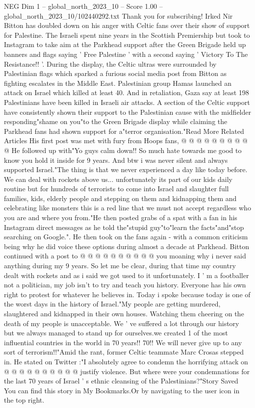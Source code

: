 \begin{textsample}{NEG Dim 1 – global\_north\_2023\_10 – Score 1.00 – global\_north\_2023\_10/102440292.txt}  \label{ex:f1_neg_131}
Thank you for subscribing!
Irked Nir Bitton has doubled down on his anger with Celtic fans over their show of support for Palestine.
The Israeli spent nine years in the Scottish Premiership but took to Instagram to take aim at the Parkhead support after the Green Brigade held up banners and flags saying ' Free Palestine ' with a second saying ' Victory To The Resistance!! '.
During the display, the Celtic ultras were surrounded by Palestinian flags which sparked a furious social media post from Bitton as fighting escalates in the Middle East.
Palestinian group Hamas launched an attack on Israel which killed at least 40.
And in retaliation, Gaza say at least 198 Palestinians have been killed in Israeli air attacks.
A section of the Celtic support have consistently shown their support to the Palestinian cause with the midfielder responding"shame on you"to the Green Brigade display while claiming the Parkhead fans had shown support for a"terror organisation."Read More Related Articles His first post was met with fury from Hoops fans, @ @ @ @ @ @ @ @ @ @ He followed up with"Yo guys calm down!!
So much hate towards me good to know you hold it inside for 9 years.
And btw i was never silent and always supported Israel."The thing is that we never experienced a day like today before.
We can deal with rockets above us... unfortunately its part of our kids daily routine but for hundreds of terrorists to come into Israel and slaughter full families, kids, elderly people and stepping on them and kidnapping them and celebrating like monsters this is a red line that we must not accept regardless who you are and where you from."He then posted grabs of a spat with a fan in his Instagram direct messages as he told the"stupid guy"to"learn the facts"and"stop searching on Google.".
He then took on the fans again - with a common criticism being why he did voice these options during almost a decade at Parkhead.
Bitton continued with a post to @ @ @ @ @ @ @ @ @ @ you moaning why i never said anything during my 9 years.
So let me be clear, during that time my country dealt with rockets and as i said we got used to it unfortunately.
I ' m a footballer not a politician, my job isn't to try and teach you history.
Everyone has his own right to protest for whatever he believes in.
Today i spoke because today is one of the worst days in the history of Israel."My people are getting murdered, slaughtered and kidnapped in their own houses.
Watching them cheering on the death of my people is unacceptable.
We ' ve suffered a lot through our history but we always managed to stand up for ourselves.we created 1 of the most influential countries in the world in 70 years!! 70!!
We will never give up to any sort of terrorism!!"Amid the rant, former Celtic teammate Marc Crosas stepped in.
He stated on Twitter :"I absolutely agree to condemn the horrifying attack on @ @ @ @ @ @ @ @ @ @ justify violence.
But where were your condemnations for the last 70 years of Israel ' s ethnic cleansing of the Palestinians?"Story Saved You can find this story in My Bookmarks.Or by navigating to the user icon in the top right.

\end{textsample}
